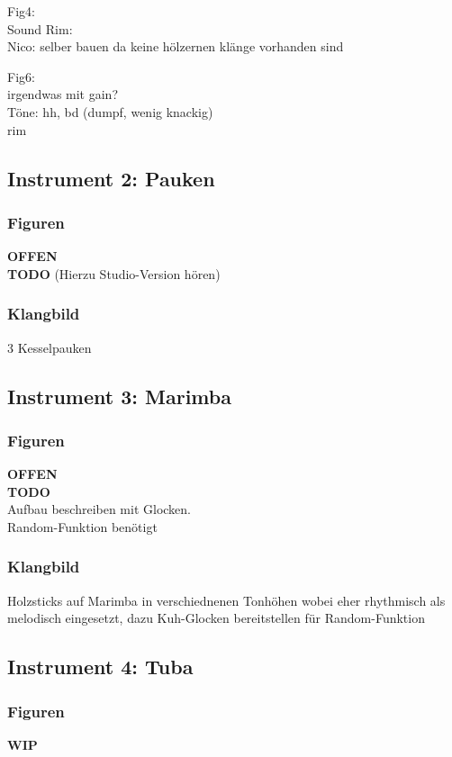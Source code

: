 \documentclass[
10pt, %
a4paper, %
oneside, %
headinclude,footinclude, %
BCOR5mm, %
]{scrartcl}
\begin{document}
Fig4:\\
Sound Rim:\\
Nico: selber bauen da keine hölzernen klänge vorhanden sind

Fig6:\\
irgendwas mit gain?\\



Töne: hh, bd (dumpf, wenig knackig)\\
rim

\subsection{Instrument 2: Pauken}
\subsubsection{Figuren}
{\color{red}\textbf{OFFEN}} \\
{\color{red}\textbf{TODO}}
(Hierzu Studio-Version hören)\\

\subsubsection{Klangbild}
3 Kesselpauken

\subsection{Instrument 3: Marimba}
\subsubsection{Figuren}
{\color{red}\textbf{OFFEN}} \\
{\color{red}\textbf{TODO}}\\
Aufbau beschreiben mit Glocken.\\
Random-Funktion benötigt

\subsubsection{Klangbild}
Holzsticks auf Marimba in verschiednenen Tonhöhen wobei eher rhythmisch als melodisch eingesetzt, dazu Kuh-Glocken bereitstellen für Random-Funktion

\subsection{Instrument 4: Tuba}
\subsubsection{Figuren}
{\color{orange}\textbf{WIP}} \\
\end{document}

